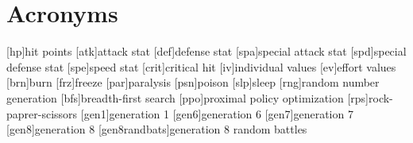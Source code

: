 
\chapter*{Acronyms}

\begin{acronym}
	[hp]{hit points}
	[atk]{attack stat}
	[def]{defense stat}
	[spa]{special attack stat}
	[spd]{special defense stat}
	[spe]{speed stat}
	[crit]{critical hit}
	[iv]{individual values}
	[ev]{effort values}
	[brn]{burn}
	[frz]{freeze}
	[par]{paralysis}
	[psn]{poison}
	[slp]{sleep}
	[rng]{random number generation}
	[bfs]{breadth-first search}
	[ppo]{proximal policy optimization}
	[rps]{rock-paprer-scissors}
	[gen1]{generation 1}
	[gen6]{generation 6}
	[gen7]{generation 7}
	[gen8]{generation 8}
	[gen8randbats]{generation 8 random battles}
\end{acronym}